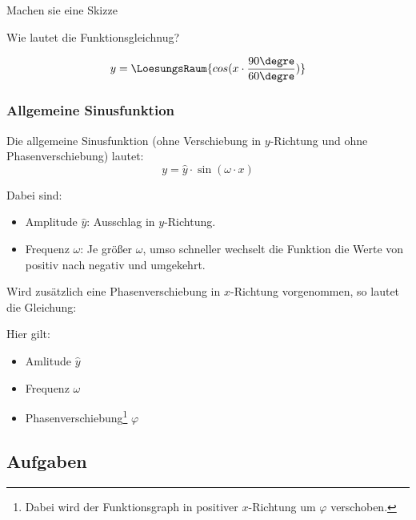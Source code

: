 Machen sie eine Skizze


Wie lautet die Funktionsgleichnug?

$$y = \LoesungsRaum{cos(x\cdot\frac{90\degre}{60\degre})}$$
\newpage




\subsubsection{Allgemeine Sinusfunktion}

Die allgemeine Sinusfunktion (ohne Verschiebung in $y$-Richtung und
ohne Phasenverschiebung) lautet:
$$y=\hat{y}\cdot{}\sin(\omega\cdot{}x)$$

Dabei sind:
\begin{itemize}

\item
  Amplitude $\hat{y}$: Ausschlag in $y$-Richtung.
\item
  Frequenz $\omega$: Je größer $\omega$, umso schneller wechselt die
  Funktion die Werte von positiv nach negativ und umgekehrt.
\end{itemize}

Wird zusätzlich eine Phasenverschiebung in $x$-Richtung vorgenommen, so lautet die Gleichung:

\begin{center}
  \end{center}

Hier gilt:
\begin{itemize}

\item
  Amlitude $\hat{y}$
\item
  Frequenz $\omega$
\item
  Phasenverschiebung\footnote{Dabei wird der Funktionsgraph in positiver $x$-Richtung um
    $\varphi$ verschoben.} $\varphi$
\end{itemize}


\subsection*{Aufgaben}
